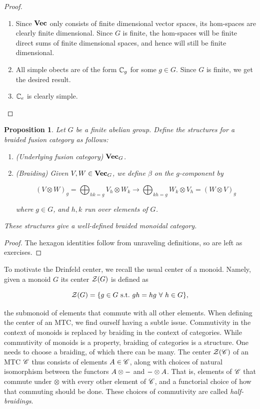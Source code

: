 \documentclass{article}
\newtheorem{proposition}{Proposition}[section]
\theoremstyle{definition}
\numberwithin{figure}{section}
\begin{document}
\begin{proof}
\begin{enumerate}
\item Since $\bold{Vec}$ only consists of finite dimensional vector spaces, its hom-spaces are clearly finite dimensional. Since $G$ is finite, the hom-spaces will be finite direct sums of finite dimensional spaces, and hence will still be finite dimensional.

\item All simple obects are of the form $\mathbb{C}_g$ for some $g\in G$. Since $G$ is finite, we get the desired result.

\item $\mathbb{C}_e$ is clearly simple.

\end{enumerate}
\end{proof}

\begin{proposition} Let $G$ be a finite abelian group. Define the structures for a braided fusion category as follows:

\begin{enumerate}
\item (Underlying fusion category) $\bold{Vec}_G$.
\item (Braiding) Given $V,W\in \bold{Vec}_G$, we define $\beta$ on the $g$-component by

$$\left(V\otimes W\right)_g = \bigoplus_{hk=g}V_h\otimes W_k \xrightarrow{} \bigoplus_{kh=g}W_k\otimes V_h=\left(W\otimes V\right)_g$$

where $g\in G$, and $h,k$ run over elements of $G$.
\end{enumerate}

These structures give a well-defined braided monoidal category.
\end{proposition}
\begin{proof} The hexagon identities follow from unraveling definitions, so are left as exercises.
\end{proof}


To motivate the Drinfeld center, we recall the usual center of a monoid. Namely, given a monoid $G$ its center $\mathcal{Z}(G)$ is defined as

$$\mathcal{Z}(G)=\{g\in G \,\,\mathrm{s.t.}\,\, gh=hg\,\,\forall\,\, h\in G\},$$

the submonoid of elements that commute with all other elements. When defining the center of an MTC, we find ourself having a subtle issue. Commutivity in the context of monoids is replaced by braiding in the context of categories. While commutivity of monoids is a property, braiding of categories is a structure. One needs to choose a braiding, of which there can be many. The center $\mathcal{Z}(\mathscr{C})$ of an MTC $\mathscr{C}$ thus consists of elements $A\in \mathscr{C}$, along with choices of natural isomorphism between the functors $A\otimes \--$ and $\-- \otimes A$. That is, elements of $\mathscr{C}$ that commute under $\otimes$ with every other element of $\mathscr{C}$, and a functorial choice of how that commuting should be done. These choices of commutivity are called \textit{half-braidings}.
\end{document}
